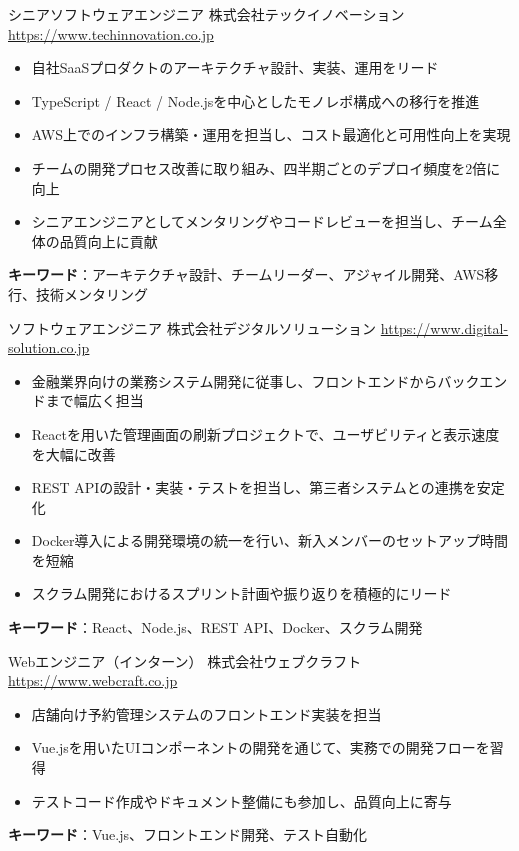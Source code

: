 \documentclass[a4paper, serif, 10pt]{moderncv}
\begin{document}
        {シニアソフトウェアエンジニア}
        {株式会社テックイノベーション}
        {\url{https://www.techinnovation.co.jp}}
        {}
        {\begin{itemize}
\item 自社SaaSプロダクトのアーキテクチャ設計、実装、運用をリード
\item TypeScript / React / Node.jsを中心としたモノレポ構成への移行を推進
\item AWS上でのインフラ構築・運用を担当し、コスト最適化と可用性向上を実現
\item チームの開発プロセス改善に取り組み、四半期ごとのデプロイ頻度を2倍に向上
\item シニアエンジニアとしてメンタリングやコードレビューを担当し、チーム全体の品質向上に貢献
\end{itemize}
\textbf{キーワード}：アーキテクチャ設計、チームリーダー、アジャイル開発、AWS移行、技術メンタリング}

        {ソフトウェアエンジニア}
        {株式会社デジタルソリューション}
        {\url{https://www.digital-solution.co.jp}}
        {}
        {\begin{itemize}
\item 金融業界向けの業務システム開発に従事し、フロントエンドからバックエンドまで幅広く担当
\item Reactを用いた管理画面の刷新プロジェクトで、ユーザビリティと表示速度を大幅に改善
\item REST APIの設計・実装・テストを担当し、第三者システムとの連携を安定化
\item Docker導入による開発環境の統一を行い、新入メンバーのセットアップ時間を短縮
\item スクラム開発におけるスプリント計画や振り返りを積極的にリード
\end{itemize}
\textbf{キーワード}：React、Node.js、REST API、Docker、スクラム開発}

        {Webエンジニア（インターン）}
        {株式会社ウェブクラフト}
        {\url{https://www.webcraft.co.jp}}
        {}
        {\begin{itemize}
\item 店舗向け予約管理システムのフロントエンド実装を担当
\item Vue.jsを用いたUIコンポーネントの開発を通じて、実務での開発フローを習得
\item テストコード作成やドキュメント整備にも参加し、品質向上に寄与
\end{itemize}
\textbf{キーワード}：Vue.js、フロントエンド開発、テスト自動化}
\end{document}
